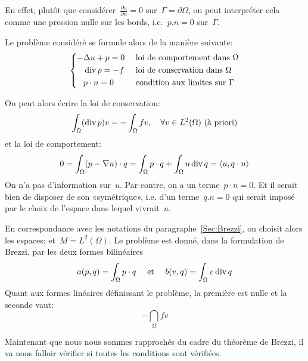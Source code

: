 En effet, plutôt que considérer~$\frac{\partial u}{\partial n}=0$ sur~$\Gamma=\partial\Omega$, on peut interpréter cela comme une pression nulle sur les bords, i.e.~$p.n=0$ sur~$\Gamma$.

\medskip
Le problème considéré se formule alors de la manière suivante:
\begin{equation}\left\{
\begin{aligned}
-&\Delta u +p =0 && \text{ loi de comportement dans } \Omega\\
&\operatorname{div} p = -f && \text{ loi de conservation dans } \Omega\\
& p\cdot n=0 && \text{ condition aux limites sur }\Gamma
\end{aligned}
\right.
\end{equation}

On peut alors écrire la loi de conservation:
\begin{equation}
\displaystyle\int_\Omega (\operatorname{div} p) v = -\displaystyle\int_\Omega fv,\quad \forall v\in L^2(\Omega) \text{ (à priori)}
\end{equation}
et la loi de comportement:
\begin{equation}
0=\displaystyle\int_\Omega (p-\nabla u)\cdot q = \displaystyle\int_\Omega p\cdot q + \displaystyle\int_\Omega u \operatorname{div} q=\langle u,q\cdot n\rangle
\end{equation}
On n'a pas d'information sur~$u$. Par contre, on a un terme~$p\cdot n=0$. Et il serait bien de disposer de son «symétrique», i.e. d'un terme~$q.n=0$ qui serait imposé par le choix de l'espace dans lequel vivrait~$u$. 

\medskip
En correspondance avec les notations du paragraphe~\ref{Sec:Brezzi}, on choisit alors les espaces:  et~$M=L^2(\Omega)$. Le problème est donné, dans la formulation de Brezzi, par les deux formes bilinéaires
\begin{equation}a(p,q)=\displaystyle\int_\Omega p\cdot q\quad\text{ et }\quad b(v,q)=\displaystyle\int_\Omega v\operatorname{div} q\end{equation}
Quant aux formes linéaires définissant le problème, la première est nulle et la seconde vaut:\begin{equation}-\dint_\Omega fv\end{equation}

\medskip
Maintenant que nous nous sommes rapprochés du cadre du théorème de Brezzi, il va nous falloir vérifier si toutes les conditions sont vérifiées. 

